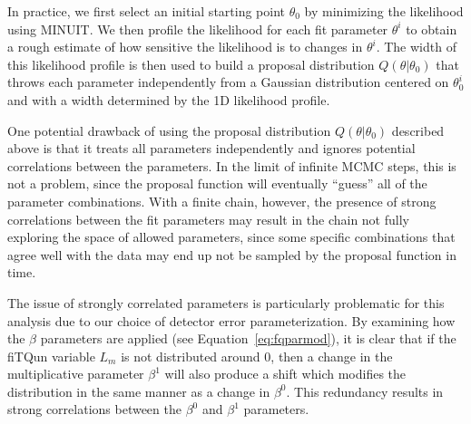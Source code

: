 In practice, we first select an initial starting point $\theta_{0}$ by
minimizing the likelihood using MINUIT\@.  We then profile the likelihood for
each fit parameter $\theta^{i}$ to obtain a rough estimate of how sensitive the
likelihood is to changes in $\theta^{i}$.  The width of this likelihood profile
is then used to build a proposal distribution $Q(\theta|\theta_{0})$ that
throws each parameter independently from a Gaussian distribution centered on
$\theta^{i}_{0}$ and with a width determined by the 1D likelihood profile.

One potential drawback of using the proposal distribution
$Q(\theta|\theta_{0})$ described above is that it treats all parameters
independently and ignores potential correlations between the parameters.  In
the limit of infinite MCMC steps, this is not a problem, since the proposal
function will eventually ``guess'' all of the parameter combinations.  With a
finite chain, however, the presence of strong correlations between the fit
parameters may result in the chain not fully exploring the space of allowed
parameters, since some specific combinations that agree well with the data may
end up not be sampled by the proposal function in time.

The issue of strongly correlated parameters is particularly problematic for
this analysis due to our choice of detector error parameterization.  By
examining how the $\beta$ parameters are applied (see
Equation~\ref{eq:fqparmod}), it is clear that if the fiTQun variable $L_{m}$ is
not distributed around $0$, then a change in the multiplicative parameter
$\beta^{1}$ will also produce a shift which modifies the distribution in the
same manner as a change in $\beta^{0}$.  This redundancy results in strong
correlations between the $\beta^{0}$ and $\beta^{1}$ parameters.

